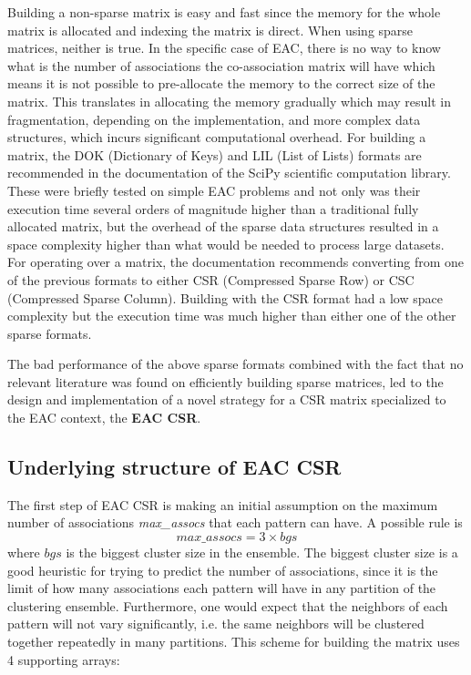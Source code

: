 Building a non-sparse matrix is easy and fast since the memory for the whole matrix is allocated and indexing the matrix is direct.
When using sparse matrices, neither is true.
In the specific case of EAC, there is no way to know what is the number of associations the co-association matrix will have which means it is not possible to pre-allocate the memory to the correct size of the matrix.
This translates in allocating the memory gradually which may result in fragmentation, depending on the implementation, and more complex data structures, which incurs significant computational overhead.
For building a matrix, the DOK (Dictionary of Keys) and LIL (List of Lists) formats are recommended in the documentation of the SciPy \cite{JonesSciPy} scientific computation library.
These were briefly tested on simple EAC problems and not only was their execution time several orders of magnitude higher than a traditional fully allocated matrix, but the overhead of the sparse data structures resulted in a space complexity higher than what would be needed to process large datasets.
For operating over a matrix, the documentation recommends converting from one of the previous formats to either CSR (Compressed Sparse Row) or CSC (Compressed Sparse Column).
Building with the CSR format had a low space complexity but the execution time was much higher than either one of the other sparse formats.

The bad performance of the above sparse formats combined with the fact that no relevant literature was found on efficiently building sparse matrices, led to the design and implementation of a novel strategy for a CSR matrix specialized to the EAC context, the \textbf{EAC CSR}.

\subsection{Underlying structure of EAC CSR}

The first step of EAC CSR is making an initial assumption on the maximum number of associations \emph{max\_assocs} that each pattern can have.
A possible rule is $$max\_assocs = 3 \times bgs$$ where $bgs$ is the biggest cluster size in the ensemble.
The biggest cluster size is a good heuristic for trying to predict the number of associations, since it is the limit of how many associations each pattern will have in any partition of the clustering ensemble.
Furthermore, one would expect that the neighbors of each pattern will not vary significantly, i.e. the same neighbors will be clustered together repeatedly in many partitions.
This scheme for building the matrix uses 4 supporting arrays:

